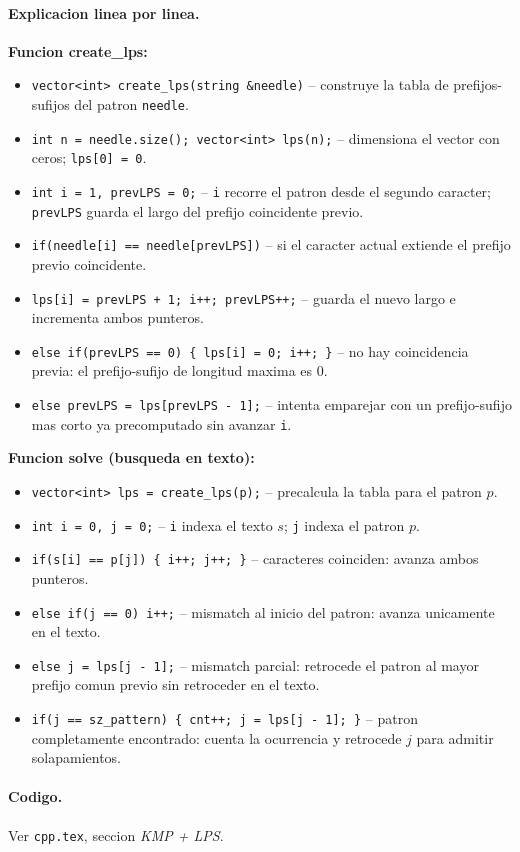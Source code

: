 \paragraph{Explicacion linea por linea.}
\textbf{Funcion create\_lps:}
\begin{itemize}\setlength\itemsep{0pt}
	\item \verb|vector<int> create_lps(string &needle)| -- construye la tabla de prefijos-sufijos del patron \verb|needle|.
	\item \verb|int n = needle.size(); vector<int> lps(n);| -- dimensiona el vector con ceros; \verb|lps[0] = 0|.
	\item \verb|int i = 1, prevLPS = 0;| -- \verb|i| recorre el patron desde el segundo caracter; \verb|prevLPS| guarda el largo del prefijo coincidente previo.
	\item \verb|if(needle[i] == needle[prevLPS])| -- si el caracter actual extiende el prefijo previo coincidente.
	\item \verb|lps[i] = prevLPS + 1; i++; prevLPS++;| -- guarda el nuevo largo e incrementa ambos punteros.
	\item \verb|else if(prevLPS == 0) { lps[i] = 0; i++; }| -- no hay coincidencia previa: el prefijo-sufijo de longitud maxima es 0.
	\item \verb|else prevLPS = lps[prevLPS - 1];| -- intenta emparejar con un prefijo-sufijo mas corto ya precomputado sin avanzar \verb|i|.
\end{itemize}
\textbf{Funcion solve (busqueda en texto):}
\begin{itemize}\setlength\itemsep{0pt}
	\item \verb|vector<int> lps = create_lps(p);| -- precalcula la tabla para el patron $p$.
	\item \verb|int i = 0, j = 0;| -- \verb|i| indexa el texto $s$; \verb|j| indexa el patron $p$.
	\item \verb|if(s[i] == p[j]) { i++; j++; }| -- caracteres coinciden: avanza ambos punteros.
	\item \verb|else if(j == 0) i++;| -- mismatch al inicio del patron: avanza unicamente en el texto.
	\item \verb|else j = lps[j - 1];| -- mismatch parcial: retrocede el patron al mayor prefijo comun previo sin retroceder en el texto.
	\item \verb|if(j == sz_pattern) { cnt++; j = lps[j - 1]; }| -- patron completamente encontrado: cuenta la ocurrencia y retrocede $j$ para admitir solapamientos.
\end{itemize}

\paragraph{Codigo.}
Ver \texttt{cpp.tex}, seccion \textit{KMP + LPS}.

\vspace{0.5em}
